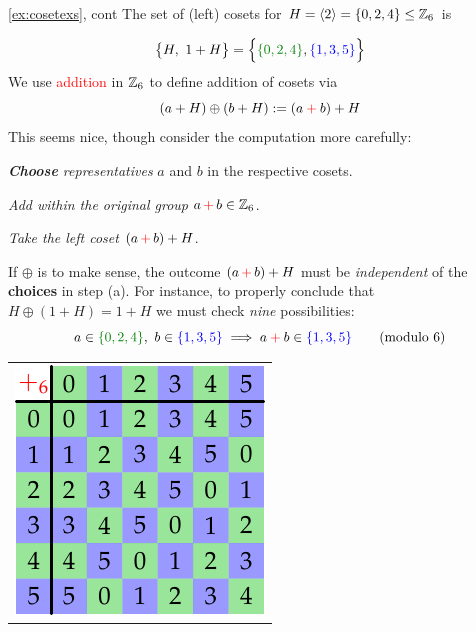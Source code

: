 \begin{examples*}{\ref{ex:cosetexs}, cont}{}
	\exstart The set of (left) cosets for $H=\left\langle 2\right\rangle=\{0,2,4\}\le\mathbb{Z}_6$ is
	\begin{enumerate}\setcounter{enumi}{1}
		\begin{minipage}[t]{0.7\linewidth}\vspace{-15pt}
		  \item[] 
			\[
				\bigl\{
					H,\ 1+H
				\bigr\}
				=\Bigl\{
					\textcolor{Green}{\{0,2,4\}}, \textcolor{blue}{\{1,3,5\}}
				\Bigr\}
			\]
			We use \textcolor{red}{addition} in $\mathbb{Z}_6$ to define addition of cosets via
			\[
				(a+H)\oplus(b+H):=(a\mathbin{\textcolor{red}{+}}b)+H
			\]
			This seems nice, though consider the computation more carefully:\vspace{-2pt}
		  \begin{enumeratea}
				\item \emph{\textbf{Choose} representatives} $a$ and $b$ in the respective cosets.
				\item \emph{Add within the original group} $a\operatorname{\textcolor{red}{+}}b\in\mathbb{Z}_6$.
				\item \emph{Take the left coset} $(a\operatorname{\textcolor{red}{+}}b)+H$.
			\end{enumeratea}
			If $\oplus$ is to make sense, the outcome $(a\operatorname{\textcolor{red}{+}}b)+H$ must be \emph{independent} of the \textbf{choices} in step (a). For instance, to properly conclude that $H\oplus(1+H)=1+H$ we must check \emph{nine} possibilities:
			\[
				a\in \textcolor{Green}{\{0,2,4\}},\  b\in\textcolor{blue}{\{1,3,5\}} \implies a\mathbin{\textcolor{red}{+}} b\in\textcolor{blue}{\{1,3,5\}} \tag{modulo 6}
			\]
		\end{minipage}
		\hfill
		\begin{minipage}[t]{0.25\linewidth}\vspace{-2pt}
			\hfill
			\begin{tabular}{@{}c@{}}
				\includegraphics[scale=0.9]{factor-z6}\\

\end{tabular}
\end{minipage}
\end{enumerate}
\end{examples*}
